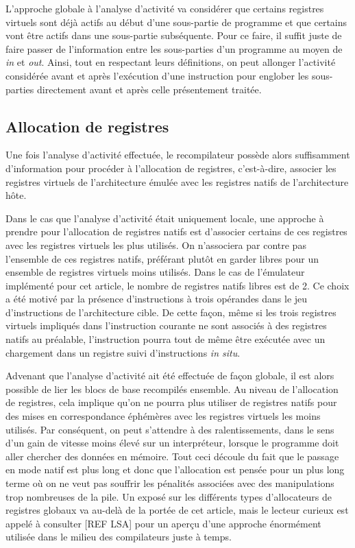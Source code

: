 \documentclass{article} %
\begin{document}
L'approche globale à l'analyse d'activité va considérer que certains registres virtuels sont déjà actifs au début d'une sous-partie de programme et que certains vont être actifs dans une sous-partie subséquente. Pour ce faire, il suffit juste de faire passer de l'information entre les sous-parties d'un programme au moyen de \textit{in} et \textit{out}. Ainsi, tout en respectant leurs définitions, on peut allonger l'activité considérée avant et après l'exécution d'une instruction pour englober les sous-parties directement avant et après celle présentement traitée.

\subsection{Allocation de registres}
Une fois l'analyse d'activité effectuée, le recompilateur possède alors suffisamment d'information pour procéder à l'allocation de registres, c'est-à-dire, associer les registres virtuels de l'architecture émulée avec les registres natifs de l'architecture hôte.

Dans le cas que l'analyse d'activité était uniquement locale, une approche à prendre pour l'allocation de registres natifs est d'associer certains de ces registres avec les registres virtuels les plus utilisés. On n'associera par contre pas l'ensemble de ces registres natifs, préférant plutôt en garder libres pour un ensemble de registres virtuels moins utilisés. Dans le cas de l'émulateur implémenté pour cet article, le nombre de registres natifs libres est de 2. Ce choix a été motivé par la présence d'instructions à trois opérandes dans le jeu d'instructions de l'architecture cible. De cette façon, même si les trois registres virtuels impliqués dans l'instruction courante ne sont associés à des registres natifs au préalable, l'instruction pourra tout de même être exécutée avec un chargement dans un registre suivi d'instructions \textit{in situ}.

Advenant que l'analyse d'activité ait été effectuée de façon globale, il est alors possible de lier les blocs de base recompilés ensemble. Au niveau de l'allocation de registres, cela implique qu'on ne pourra plus utiliser de registres natifs pour des mises en correspondance éphémères avec les registres virtuels les moins utilisés. Par conséquent, on peut s'attendre à des ralentissements, dans le sens d'un gain de vitesse moins élevé sur un interpréteur, lorsque le programme doit aller chercher des données en mémoire. Tout ceci découle du fait que le passage en mode natif est plus long et donc que l'allocation est pensée pour un plus long terme où on ne veut pas souffrir les pénalités associées avec des manipulations trop nombreuses de la pile. Un exposé sur les différents types d'allocateurs de registres globaux va au-delà de la portée de cet article, mais le lecteur curieux est appelé à consulter [REF LSA] pour un aperçu d'une approche énormément utilisée dans le milieu des compilateurs juste à temps.
\end{document}

